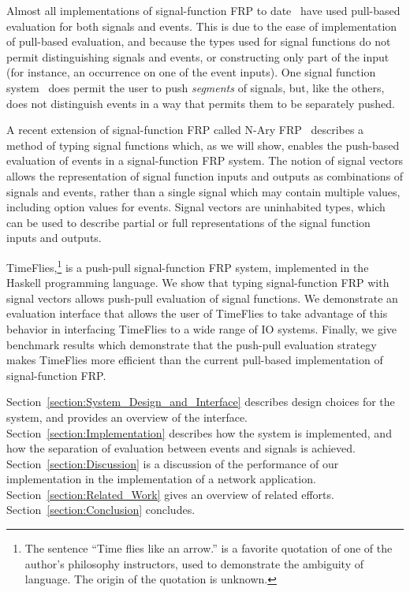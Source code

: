 Almost all implementations of signal-function FRP to date~\cite{Courtney2001-1,Nilsson2002,Nilsson2005,Sculthorpe2011}
have used pull-based evaluation for both signals and events. This is due to the
ease of implementation of pull-based evaluation, and because the types used for
signal functions do not permit distinguishing signals and events, or
constructing only part of the input (for instance, an occurrence on one of the
event inputs). One signal function system~\cite{Jeffrey2012} does permit the
user to push {\em segments} of signals, but, like the others, does not
distinguish events in a way that permits them to be separately pushed.

A recent extension of signal-function FRP called N-Ary FRP~\cite{Sculthorpe2011}
describes a method of typing signal functions which, as we will show, enables
the push-based evaluation of events in a signal-function FRP system. The notion
of signal vectors allows the representation of signal function inputs and
outputs as combinations of signals and events, rather than a single signal which
may contain multiple values, including option values for events. Signal vectors
are uninhabited types, which can be used to describe partial or full representations
of the signal function inputs and outputs.

TimeFlies,\footnote{The sentence ``Time flies like an arrow.'' is a 
favorite quotation of one of the author's philosophy instructors, used to
demonstrate the ambiguity of language. The origin of the quotation is unknown.}
is a push-pull signal-function FRP system, implemented in the Haskell
programming language. We show that typing signal-function FRP with signal
vectors allows push-pull evaluation of signal functions. We demonstrate an
evaluation interface that allows the user of TimeFlies to take advantage of this
behavior in interfacing TimeFlies to a wide range of IO systems. Finally, we
give benchmark results which demonstrate that the push-pull evaluation strategy
makes TimeFlies more efficient than the current pull-based implementation of
signal-function FRP.

Section~\ref{section:System_Design_and_Interface} describes design choices for the system,
and provides an overview of the interface. Section~\ref{section:Implementation}
describes how the system is implemented, and how the separation of evaluation
between events and signals is achieved. Section~\ref{section:Discussion} is a
discussion of the performance of our implementation in the implementation of a
network application. Section~\ref{section:Related_Work} gives an overview of
related efforts. Section~\ref{section:Conclusion} concludes.

